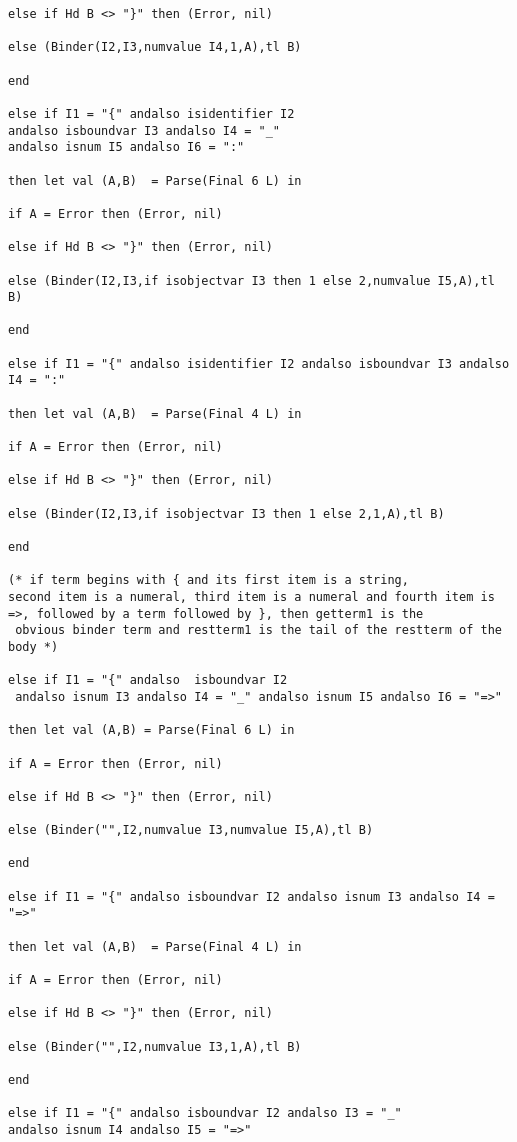\documentclass{article}
\begin{document}
{{\begin{verbatim}
else if Hd B <> "}" then (Error, nil)

else (Binder(I2,I3,numvalue I4,1,A),tl B)

end

else if I1 = "{" andalso isidentifier I2 
andalso isboundvar I3 andalso I4 = "_" 
andalso isnum I5 andalso I6 = ":"

then let val (A,B)  = Parse(Final 6 L) in

if A = Error then (Error, nil)

else if Hd B <> "}" then (Error, nil)

else (Binder(I2,I3,if isobjectvar I3 then 1 else 2,numvalue I5,A),tl B)

end

else if I1 = "{" andalso isidentifier I2 andalso isboundvar I3 andalso I4 = ":"

then let val (A,B)  = Parse(Final 4 L) in

if A = Error then (Error, nil)

else if Hd B <> "}" then (Error, nil)

else (Binder(I2,I3,if isobjectvar I3 then 1 else 2,1,A),tl B)

end

(* if term begins with { and its first item is a string, 
second item is a numeral, third item is a numeral and fourth item is
=>, followed by a term followed by }, then getterm1 is the
 obvious binder term and restterm1 is the tail of the restterm of the body *)

else if I1 = "{" andalso  isboundvar I2
 andalso isnum I3 andalso I4 = "_" andalso isnum I5 andalso I6 = "=>"

then let val (A,B) = Parse(Final 6 L) in 

if A = Error then (Error, nil)

else if Hd B <> "}" then (Error, nil)

else (Binder("",I2,numvalue I3,numvalue I5,A),tl B)

end 

else if I1 = "{" andalso isboundvar I2 andalso isnum I3 andalso I4 = "=>"

then let val (A,B)  = Parse(Final 4 L) in

if A = Error then (Error, nil)

else if Hd B <> "}" then (Error, nil)

else (Binder("",I2,numvalue I3,1,A),tl B)

end

else if I1 = "{" andalso isboundvar I2 andalso I3 = "_" 
andalso isnum I4 andalso I5 = "=>"


\end{verbatim}}}
\end{document}
